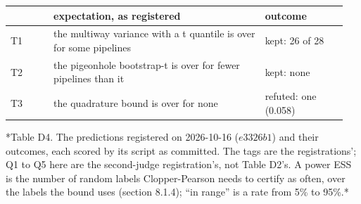 \documentclass[11pt]{article}
\begin{document}
\begingroup\footnotesize\setlength{\tabcolsep}{4pt}
\begin{longtable}{@{}>{\raggedright\arraybackslash}p{0.120\linewidth}>{\raggedright\arraybackslash}p{0.594\linewidth}>{\raggedright\arraybackslash}p{0.232\linewidth}@{}}
\toprule
 & \textbf{\hspace{0pt}expectation, as registered} & \textbf{\hspace{0pt}outcome} \\
\midrule
\endhead
\bottomrule
\endlastfoot
\hspace{0pt}T1 & \hspace{0pt}the multiway variance with a t quantile is over for some pipelines & \hspace{0pt}kept: 26 of 28 \\
\hspace{0pt}T2 & \hspace{0pt}the pigeonhole bootstrap-t is over for fewer pipelines than it & \hspace{0pt}kept: none \\
\hspace{0pt}T3 & \hspace{0pt}the quadrature bound is over for none & \hspace{0pt}refuted: one (0.058) \\
\end{longtable}
\endgroup

*Table D4. The predictions registered on 2026-10-16 ($e 3326b 1$) and their outcomes, each scored by its script as committed. The tags are the registrations'; Q1 to Q5 here are the second-judge registration's, not Table D2's. A power ESS is the number of random labels Clopper-Pearson needs to certify as often, over the labels the bound uses (section 8.1.4); ``in range'' is a rate from 5\% to 95\%.*
\end{document}
